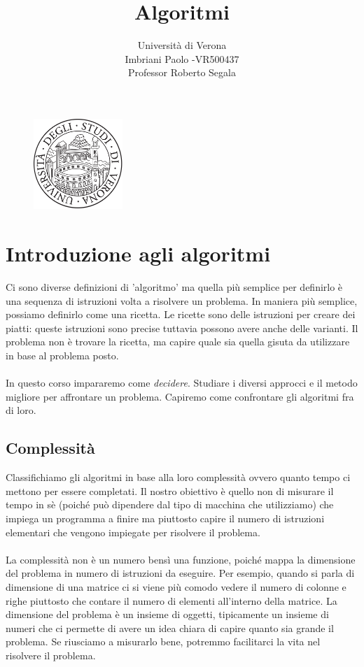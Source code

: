 \documentclass[a4paper]{article}
\title{Algoritmi}
\author{Università di Verona\\Imbriani Paolo -VR500437\\Professor Roberto Segala}
\begin{document}
\begin{figure}
    \centering
    \includegraphics[width=0.3\textwidth]{UniversityofVerona.png}
    \label{fig:centered-image}
\end{figure}

\maketitle 

\pagebreak

\tableofcontents

\pagebreak

\section{Introduzione agli algoritmi}


Ci sono diverse definizioni di 'algoritmo' ma quella più semplice per definirlo è una sequenza di istruzioni volta a risolvere un problema. In maniera più semplice, possiamo definirlo come una ricetta. Le ricette sono delle istruzioni per creare dei piatti: queste istruzioni sono precise tuttavia possono avere anche delle varianti. Il problema non è trovare la ricetta, ma capire quale sia quella gisuta da utilizzare in base al problema posto. 
\\\\
In questo corso impararemo come \textit{decidere}. Studiare i diversi approcci e il metodo migliore per affrontare un problema.
Capiremo come confrontare gli algoritmi fra di loro.

\subsection{Complessità}

Classifichiamo gli algoritmi in base alla loro complessità ovvero quanto tempo ci mettono per essere completati. Il nostro obiettivo è quello non di misurare il tempo in sè (poiché può dipendere dal tipo di macchina che utilizziamo) che impiega un programma a finire ma piuttosto capire il numero di istruzioni elementari che vengono impiegate per risolvere il problema.
\\\\
La complessità non è un numero bensì una funzione, poiché mappa la dimensione del problema in numero di istruzioni da eseguire. Per esempio, quando si parla di dimensione di una matrice ci si viene più comodo vedere il numero di colonne e righe piuttosto che contare il numero di elementi all'interno della matrice. La dimensione del problema è un insieme di oggetti, tipicamente un insieme di numeri che ci permette di avere un idea chiara di capire quanto sia grande il problema. Se riusciamo a misurarlo bene, potremmo facilitarci la vita nel risolvere il problema. 
\end{document}
